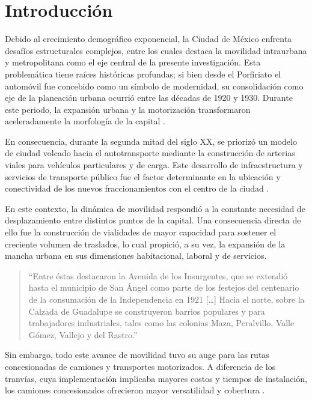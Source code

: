 
\chapter{Introducción}
\label{ch:introduccion}

Debido al crecimiento demográfico exponencial, la Ciudad de México enfrenta
desafíos estructurales complejos, entre los cuales destaca la movilidad
intraurbana y metropolitana como el eje central de la presente investigación.
Esta problemática tiene raíces históricas profundas; si bien desde el Porfiriato
el automóvil fue concebido como un símbolo de modernidad, su consolidación como
eje de la planeación urbana ocurrió entre las décadas de 1920 y 1930. Durante
este periodo, la expansión urbana y la motorización transformaron aceleradamente
la morfología de la capital \citep{franco2022}.

En consecuencia, durante la segunda mitad del siglo XX, se priorizó un modelo de
ciudad volcado hacia el autotransporte mediante la construcción de arterias
viales para vehículos particulares y de carga. Este desarrollo de
infraestructura y servicios de transporte público fue el factor determinante en
la ubicación y conectividad de los nuevos fraccionamientos con el centro de la
ciudad \citep{franco2022}.

En este contexto, la dinámica de movilidad respondió a la constante necesidad de
desplazamiento entre distintos puntos de la capital. Una consecuencia directa de
ello fue la construcción de vialidades de mayor capacidad para sostener el
creciente volumen de traslados, lo cual propició, a su vez, la expansión de la
mancha urbana en sus dimensiones habitacional, laboral y de servicios.

\begin{quote}
``Entre éstas destacaron la Avenida de los Insurgentes, que se extendió hasta el
municipio de San Ángel como parte de los festejos del centenario de la
consumación de la Independencia en 1921 [\ldots] Hacia el norte, sobre la
Calzada de Guadalupe se construyeron barrios populares y para trabajadores
industriales, tales como las colonias Maza, Peralvillo, Valle Gómez, Vallejo y
del Rastro.'' \citep{franco2022}
\end{quote}

Sin embargo, todo este avance de movilidad tuvo su auge para las rutas
concesionadas de camiones y transportes motorizados. A diferencia de los
tranvías, cuya implementación implicaba mayores costos y tiempos de instalación,
los camiones concesionados ofrecieron mayor versatilidad y cobertura
\citep{franco2022}.

